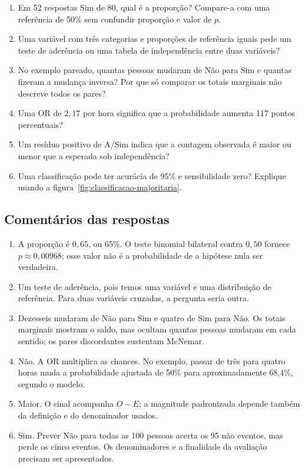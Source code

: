 \begin{enumerate}
  \item Em 52 respostas Sim de 80, qual é a proporção? Compare-a com uma referência de 50\% sem confundir proporção e valor de $p$.
  \item Uma variável com três categorias e proporções de referência iguais pede um teste de aderência ou uma tabela de independência entre duas variáveis?
  \item No exemplo pareado, quantas pessoas mudaram de Não para Sim e quantas fizeram a mudança inversa? Por que só comparar os totais marginais não descreve todos os pares?
  \item Uma OR de $2{,}17$ por hora significa que a probabilidade aumenta 117 pontos percentuais?
  \item Um resíduo positivo de A/Sim indica que a contagem observada é maior ou menor que a esperada sob independência?
  \item Uma classificação pode ter acurácia de 95\% e sensibilidade zero? Explique usando a figura~\ref{fig:classificacao-majoritaria}.
\end{enumerate}

\subsection*{Comentários das respostas}

\begin{enumerate}
  \item A proporção é $0{,}65$, ou 65\%. O teste binomial bilateral contra $0{,}50$ fornece $p\approx0{,}00968$; esse valor não é a probabilidade de a hipótese nula ser verdadeira.
  \item Um teste de aderência, pois temos uma variável e uma distribuição de referência. Para duas variáveis cruzadas, a pergunta seria outra.
  \item Dezesseis mudaram de Não para Sim e quatro de Sim para Não. Os totais marginais mostram o saldo, mas ocultam quantas pessoas mudaram em cada sentido; os pares discordantes sustentam McNemar.
  \item Não. A OR multiplica as chances. No exemplo, passar de três para quatro horas muda a probabilidade ajustada de 50\% para aproximadamente 68,4\%, segundo o modelo.
  \item Maior. O sinal acompanha $O-E$; a magnitude padronizada depende também da definição e do denominador usados.
  \item Sim. Prever Não para todas as 100 pessoas acerta os 95 não eventos, mas perde os cinco eventos. Os denominadores e a finalidade da avaliação precisam ser apresentados.
\end{enumerate}


